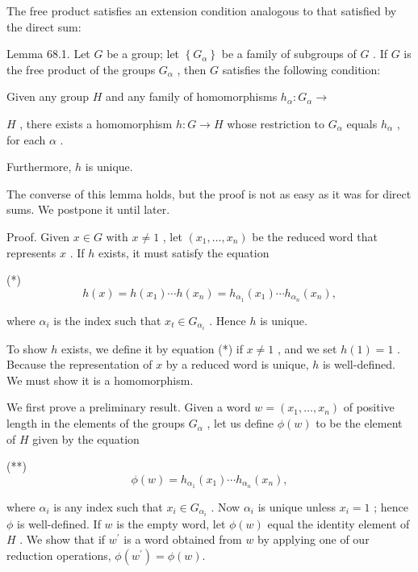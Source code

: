 \documentclass[10pt]{article}
\begin{document}
The free product satisfies an extension condition analogous to that satisfied by the direct sum:

Lemma 68.1. Let \(G\) be a group; let \(\left\{  {G}_{\alpha }\right\}\) be a family of subgroups of \(G\) . If \(G\) is the free product of the groups \({G}_{\alpha }\) , then \(G\) satisfies the following condition:

Given any group \(H\) and any family of homomorphisms \({h}_{\alpha } : {G}_{\alpha } \rightarrow\)

\(H\) , there exists a homomorphism \(h : G \rightarrow  H\) whose restriction to \({G}_{\alpha }\) equals \({h}_{\alpha }\) , for each \(\alpha\) .

Furthermore, \(h\) is unique.

The converse of this lemma holds, but the proof is not as easy as it was for direct sums. We postpone it until later.

Proof. Given \(x \in  G\) with \(x \neq  1\) , let \(\left( {{x}_{1},\ldots ,{x}_{n}}\right)\) be the reduced word that represents \(x\) . If \(h\) exists, it must satisfy the equation

(*)
\[
h\left( x\right)  = h\left( {x}_{1}\right) \cdots h\left( {x}_{n}\right)  = {h}_{{\alpha }_{1}}\left( {x}_{1}\right) \cdots {h}_{{\alpha }_{n}}\left( {x}_{n}\right) ,
\]

where \({\alpha }_{i}\) is the index such that \({x}_{t} \in  {G}_{{\alpha }_{i}}\) . Hence \(h\) is unique.

To show \(h\) exists, we define it by equation (*) if \(x \neq  1\) , and we set \(h\left( 1\right)  = 1\) . Because the representation of \(x\) by a reduced word is unique, \(h\) is well-defined. We must show it is a homomorphism.

We first prove a preliminary result. Given a word \(w = \left( {{x}_{1},\ldots ,{x}_{n}}\right)\) of positive length in the elements of the groups \({G}_{\alpha }\) , let us define \(\phi \left( w\right)\) to be the element of \(H\) given by the equation

(**)
\[
\phi \left( w\right)  = {h}_{{\alpha }_{1}}\left( {x}_{1}\right) \cdots {h}_{{\alpha }_{n}}\left( {x}_{n}\right) ,
\]

where \({\alpha }_{i}\) is any index such that \({x}_{i} \in  {G}_{{\alpha }_{i}}\) . Now \({\alpha }_{i}\) is unique unless \({x}_{i} = 1\) ; hence \(\phi\) is well-defined. If \(w\) is the empty word, let \(\phi \left( w\right)\) equal the identity element of \(H\) . We show that if \({w}^{\prime }\) is a word obtained from \(w\) by applying one of our reduction operations, \(\phi \left( {w}^{\prime }\right)  = \phi \left( w\right) .\)
\end{document}

